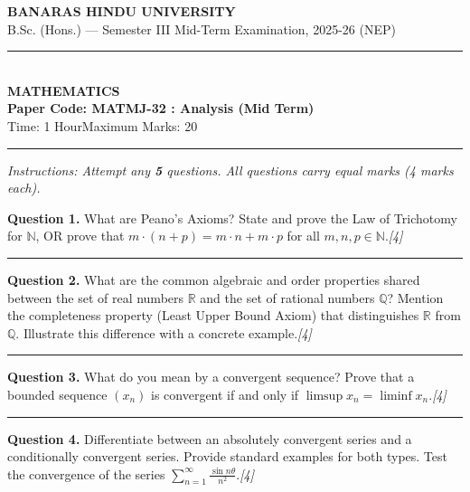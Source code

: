 \documentclass[11pt,a4paper]{article}
\newcommand{\pts}[1]{\hfill   \textit{[#1]}}
\begin{document}
\begin{center}
  {\large\bfseries BANARAS HINDU UNIVERSITY}\\[2pt]
  {\normalsize B.Sc. (Hons.) --- Semester III Mid-Term Examination, 2025-26 (NEP)}\\[6pt]
  \rule{0.8\linewidth}{0.5pt}\\[6pt]
  {\large\bfseries MATHEMATICS}\\[4pt]
  {\large\bfseries Paper Code: MATMJ-32 : Analysis (Mid Term)}\\[4pt]
  {\normalsize Time: 1 Hour\hfill Maximum Marks: 20}
\end{center}

\rule{\linewidth}{0.4pt}

\smallskip



\noindent   \textit{Instructions: Attempt any   \textbf{5} questions. All questions carry equal marks (4 marks each).}

\bigskip




\noindent   \textbf{Question 1.} What are Peano's Axioms? State and prove the Law of Trichotomy for $\mathbb{N}$, OR prove that $m \cdot (n + p) = m \cdot n + m \cdot p$ for all $m, n, p \in \mathbb{N}$.\pts{4}

\medskip\rule{\linewidth}{0.2pt}\medskip




\noindent   \textbf{Question 2.} What are the common algebraic and order properties shared between the set of real numbers $\mathbb{R}$ and the set of rational numbers $\mathbb{Q}$? Mention the completeness property (Least Upper Bound Axiom) that distinguishes $\mathbb{R}$ from $\mathbb{Q}$. Illustrate this difference with a concrete example.\pts{4}

\medskip\rule{\linewidth}{0.2pt}\medskip




\noindent   \textbf{Question 3.} What do you mean by a convergent sequence? Prove that a bounded sequence $(x_n)$ is convergent if and only if $\limsup x_n = \liminf x_n$.\pts{4}

\medskip\rule{\linewidth}{0.2pt}\medskip




\noindent   \textbf{Question 4.} Differentiate between an absolutely convergent series and a conditionally convergent series. Provide standard examples for both types. Test the convergence of the series $\sum_{n=1}^\infty \frac{\sin n \theta}{n^2}$.\pts{4}
\end{document}
